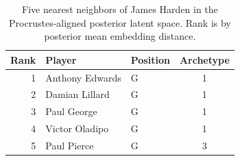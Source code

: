 \begin{table}[htbp]
  \centering\small
  \begin{tabular}{rllc}
    \toprule
    Rank & Player & Position & Archetype \\
    \midrule
    1 & Anthony Edwards & G & 1 \\
    2 & Damian Lillard & G & 1 \\
    3 & Paul George & G & 1 \\
    4 & Victor Oladipo & G & 1 \\
    5 & Paul Pierce & G & 3 \\
    \bottomrule
  \end{tabular}
  \caption{Five nearest neighbors of James Harden in the Procrustes-aligned posterior latent space. Rank is by posterior mean embedding distance.}
  \label{tab:James_Harden_neighbors}
\end{table}

